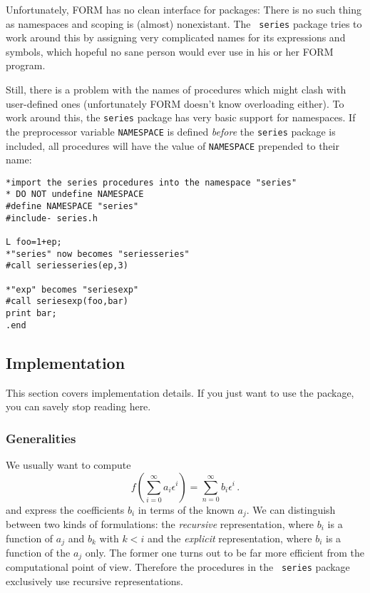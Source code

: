\documentclass{article}
\begin{document}
Unfortunately, FORM has no clean interface for packages: There is no
such thing as namespaces and scoping is (almost) nonexistant. The {\tt
  series} package tries to work around this by assigning very complicated
names for its expressions and symbols, which hopeful no sane person
would ever use in his or her FORM program.

Still, there is a problem with the names of procedures which might clash
with user-defined ones (unfortunately FORM doesn't know overloading
either). To work around this, the {\tt series} package has very basic
support for namespaces. If the preprocessor variable {\tt NAMESPACE} is
defined {\em before} the {\tt series} package is included, all
procedures will have the value of {\tt NAMESPACE} prepended to their name:
\begin{verbatim}
*import the series procedures into the namespace "series"
* DO NOT undefine NAMESPACE
#define NAMESPACE "series"
#include- series.h

L foo=1+ep;
*"series" now becomes "seriesseries"
#call seriesseries(ep,3)

*"exp" becomes "seriesexp"
#call seriesexp(foo,bar)
print bar;
.end
\end{verbatim}

\subsection{Implementation}
\label{sec:impl}

This section covers implementation details. If you just want to use the
package, you can savely stop reading here.

\subsubsection{Generalities}
\label{sec:impl_general}


 We usually want to compute
\begin{equation}
  \label{eq:def}
  f\left(\sum_{i=0}^{\infty}a_i \epsilon^i\right)=\sum_{n=0}^\infty b_i \epsilon^i\,.
\end{equation}
and express the coefficients $b_i$ in terms of the known $a_j$. We can
distinguish between two kinds of formulations: the {\it recursive} representation,
where $b_i$ is a function of $a_j$ and $b_k$ with $k < i$ and the {\it
  explicit} representation, where $b_i$ is a function of the $a_j$ only.
The former one turns out to be far more efficient from the
computational point of view. Therefore the procedures in the {\tt
  series} package exclusively use recursive representations.
\end{document}
